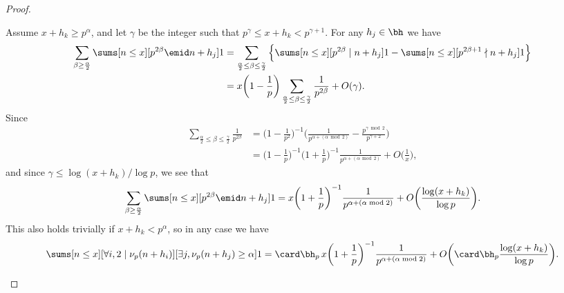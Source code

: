 \documentclass[12pt, reqno, twoside, letterpaper]{amsart}
\begin{document}
\begin{nix}
\begin{proof}
\begin{nixnix}
Assume $x + h_k \ge p^{\alpha}$, and let $\gamma$ be the integer 
such that $p^{\gamma} \le x + h_k < p^{\gamma + 1}$.
%
For any $h_j \in \bh$ we have 
\begin{align*}
  \sum_{\beta \ge \frac{\alpha}{2}}
   \sums[n \le x][p^{2\beta} \emid n + h_j] 1
 & =
     \sum_{\frac{\alpha}{2} \le \beta \le \frac{\gamma}{2}} 
      \Big\{ 
            \sums[n \le x][p^{2\beta} \mid n + h_j] 1
           - 
             \sums[n \le x][p^{2\beta + 1} \nmid n + h_j] 1
      \Big\}
 \\
 & = 
   x\bigg(1 - \frac{1}{p}\bigg)
      \sum_{\frac{\alpha}{2} \le \beta \le \frac{\gamma}{2}} 
       \frac{1}{p^{2\beta}}
       + 
        O(\gamma).
\end{align*}
%
Since  
\begin{align*}
 \sum_{\frac{\alpha}{2} \le \beta \le \frac{\gamma}{2}} 
  \frac{1}{p^{2\beta}}
   & 
   =
    \bigg(1 - \frac{1}{p^2}\bigg)^{-1}
     \bigg(\frac{1}{p^{\alpha + (\alpha \bmod 2)}} - \frac{p^{\gamma \bmod 2}}{p^{\gamma + 2}}\bigg)
  \\
   & 
    =
       \bigg(1 - \frac{1}{p}\bigg)^{-1}
        \bigg(1 + \frac{1}{p}\bigg)^{-1}
         \frac{1}{p^{\alpha + (\alpha \bmod 2)}}
       + O\bigg(\frac{1}{x}\bigg),
\end{align*}
and since $\gamma \le \log(x + h_k)/\log p$, we see that 
%
\[
 \sum_{\beta \ge \frac{\alpha}{2}}
  \sums[n \le x][p^{2\beta} \emid n + h_j] 1
   =
    x\bigg(1 + \frac{1}{p}\bigg)^{-1}
      \frac{1}{p^{\alpha + (\alpha \bmod 2)}}
       +
       O\bigg(\frac{\log(x + h_k)}{\log p}\bigg).  
\]
%
This also holds trivially if $x + h_k < p^{\alpha}$, so in any 
case we have 
\begin{equation}
 \label{eq:Sp3hestpf3}
  \sums[n \le x][\forall i, 2 \mid \nu_p(n + h_i)][\exists j, \nu_p(n + h_j) \ge \alpha] 1
   =
    \card\bh_p \,
     x\bigg(1 + \frac{1}{p}\bigg)^{-1}
       \frac{1}{p^{\alpha + (\alpha \bmod 2)}}
        +
         O\bigg(\card \bh_p \frac{\log(x + h_k)}{\log p}\bigg).
\end{equation}


\end{nixnix}
\end{proof}
\end{nix}
\end{document}
